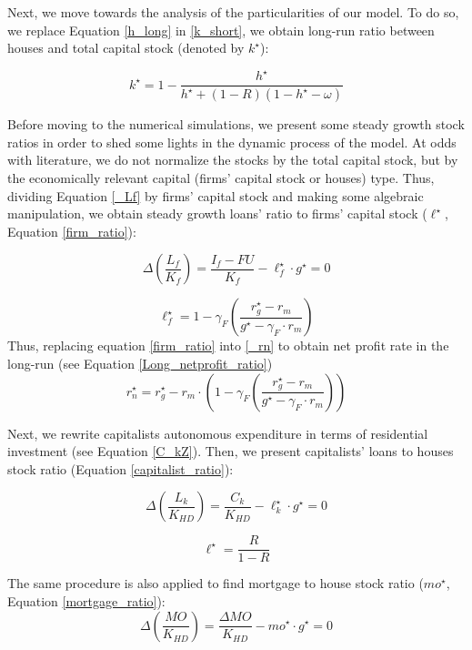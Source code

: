 \documentclass[12pt]{article}
\begin{document}
Next, we move towards the analysis of the particularities of our model.
To do so, we replace Equation \ref{h_long} in \ref{k_short}, we obtain long-run ratio between houses and total capital stock (denoted by \(k^\star\)):

\begin{equation}
\label{k_long}
k^{\star} = 1 - \frac{h^{\star}}{h^\star + (1-R)(1-h^\star - \omega)}
\end{equation}



Before moving to the numerical simulations, we present some steady growth stock ratios in order to shed some lights in the dynamic process of the model.
At odds with literature, we do not normalize the stocks by the total capital stock, but by the economically relevant capital (firms' capital stock or houses) type.
Thus, dividing Equation \ref{_Lf} by firms' capital stock and making some algebraic manipulation, we obtain steady growth loans' ratio to firms' capital stock (\(\ell^{\star}\), Equation \ref{firm_ratio}):

$$
\Delta \left(\frac{L_{f}}{K_{f}}\right) = \frac{I_{f} - FU}{K_{f}} - \ell^{\star}_{f}\cdot g^{\star}  = 0
$$

\begin{equation}
\label{firm_ratio}
\ell_f^\star = 1 - \gamma_F\left(\frac{r_g^\star - r_m}{g^\star - \gamma_F\cdot r_m}\right)
\end{equation}
Thus, replacing equation \ref{firm_ratio} into \ref{_rn} to obtain net profit rate in the long-run (see Equation \ref{Long_netprofit_ratio})
\begin{equation}
\label{Long_netprofit_ratio}
r_n^\star = r_g^\star - r_m\cdot \left(1 - \gamma_F\left(\frac{r_g^\star - r_m}{g^\star - \gamma_F\cdot r_m}\right)\right)
\end{equation}



Next, we rewrite capitalists autonomous expenditure in terms of residential investment (see Equation \ref{C_kZ}). 
Then, we  present capitalists' loans to houses stock ratio (Equation \ref{capitalist_ratio}):

$$
\Delta \left(\frac{L_k}{K_{HD}}\right) = \frac{C_k}{K_{HD}} - \ell^{\star}_{k}\cdot g^{\star} = 0
$$

\begin{equation}
\label{capitalist_ratio}
\ell^\star = \frac{R}{1-R}
\end{equation}

The same procedure is also applied to find mortgage to house stock ratio (\(mo^{\star}\), Equation \ref{mortgage_ratio}):
$$
\Delta \left(\frac{MO}{K_{HD}}\right) = \frac{\Delta MO}{K_{HD}} - mo^{\star}\cdot g^{\star} = 0
$$
\end{document}
